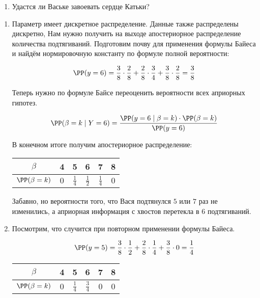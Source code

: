 \begin{problem}
\begin{enumerate}
	\item Удастся ли Ваське завоевать сердце Катьки? 
\end{enumerate} 

	\begin{sol}
\begin{enumerate}
	
	\item Параметр имеет дискретное распределение. Данные также распределены дискретно, Нам нужно получить на выходе апостериорное распределение количества подтягиваний. Подготовим почву для применения формулы Байеса и найдём нормировочную константу по формуле полной вероятности: 
	
	\[ \PP(y = 6) = \frac{3}{8} \cdot \frac{2}{8} +\frac{2}{8} \cdot \frac{3}{4} + \frac{3}{8} \cdot \frac{2}{8} = \frac{3}{8} \]
	
	Теперь нужно по формуле Байсе переоценить вероятности всех априорных гипотез. 
	
	\[ \PP(\beta = k \mid Y = 6) = \frac{\PP(y = 6 \mid \beta = k) \cdot \PP(\beta = k) }{ \PP(y=6)}\]
	
	В конечном итоге получим апостериорное распределение: 
	
	\begin{center}
		\begin{tabular}{c|c|c|c|c|c}
			$\beta$ & 4 & 5 & 6 & 7 & 8 \\ \hline
			$\PP(\beta = k)$ & $0 $ & $\frac{1}{4}$ &  $\frac{1}{2}$ &  $\frac{1}{4}$ &  $0$ \\ 
		\end{tabular}
	\end{center}
	
	Забавно, но вероятности того, что Вася подтянулся $5$ или $7$ раз не изменились, а априорная информация с хвостов перетекла в $6$ подтягиваний. 
	
	\item Посмотрим, что случится при повторном применении формулы Байеса. 
	
	\[ \PP(y = 5) = \frac{3}{8} \cdot \frac{1}{2} +\frac{2}{8} \cdot \frac{1}{4} + \frac{3}{8} \cdot  0 = \frac{1}{4} \]
	
	\begin{center}
		\begin{tabular}{c|c|c|c|c|c}
			$\beta$ & 4 & 5 & 6 & 7 & 8 \\ \hline
			$\PP(\beta = k)$ & $0 $ & $ \frac{1}{4}$ &  $ \frac{3}{4}$ &  $ 0$ &  $0$ \\ 
		\end{tabular}
	\end{center}
	

\end{enumerate}
\end{sol}
\end{problem}
